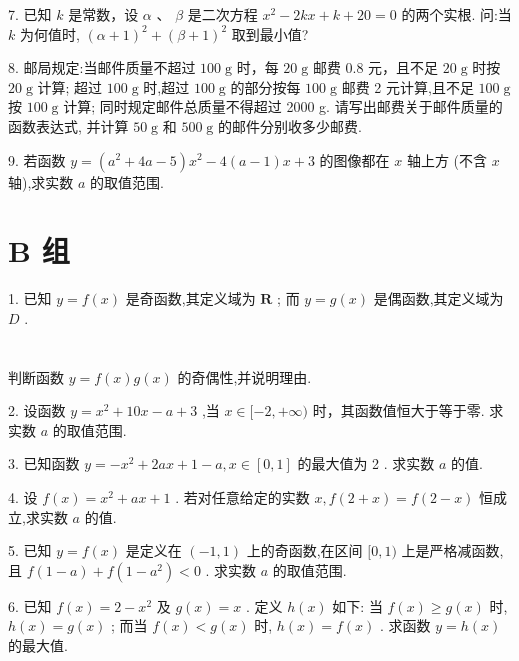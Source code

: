 \documentclass[10pt]{article}
\begin{document}
7. 已知 \(k\) 是常数，设 \(\alpha\) 、 \(\beta\) 是二次方程 \({x}^{2} - {2kx} + k + {20} = 0\) 的两个实根. 问:当 \(k\) 为何值时, \({\left( \alpha  + 1\right) }^{2} + {\left( \beta  + 1\right) }^{2}\) 取到最小值?

8. 邮局规定:当邮件质量不超过 \({100}\mathrm{\;g}\) 时，每 \({20}\mathrm{\;g}\) 邮费 0.8 元，且不足 \({20}\mathrm{\;g}\) 时按 \({20}\mathrm{\;g}\) 计算; 超过 \({100}\mathrm{\;g}\) 时,超过 \({100}\mathrm{\;g}\) 的部分按每 \({100}\mathrm{\;g}\) 邮费 2 元计算,且不足 \({100}\mathrm{\;g}\) 按 \({100}\mathrm{\;g}\) 计算; 同时规定邮件总质量不得超过 2000 g. 请写出邮费关于邮件质量的函数表达式, 并计算 \({50}\mathrm{\;g}\) 和 \({500}\mathrm{\;g}\) 的邮件分别收多少邮费.

9. 若函数 \(y = \left( {{a}^{2} + {4a} - 5}\right) {x}^{2} - 4\left( {a - 1}\right) x + 3\) 的图像都在 \(x\) 轴上方 (不含 \(x\) 轴),求实数 \(a\) 的取值范围.

\section*{B 组}

1. 已知 \(y = f\left( x\right)\) 是奇函数,其定义域为 \(\mathbf{R}\) ; 而 \(y = g\left( x\right)\) 是偶函数,其定义域为 \(D\) .

\section*{}

判断函数 \(y = f\left( x\right) g\left( x\right)\) 的奇偶性,并说明理由.

2. 设函数 \(y = {x}^{2} + {10x} - a + 3\) ,当 \(x \in  \lbrack  - 2, + \infty )\) 时，其函数值恒大于等于零. 求实数 \(a\) 的取值范围.

3. 已知函数 \(y =  - {x}^{2} + {2ax} + 1 - a,x \in  \left\lbrack  {0,1}\right\rbrack\) 的最大值为 2 . 求实数 \(a\) 的值.

4. 设 \(f\left( x\right)  = {x}^{2} + {ax} + 1\) . 若对任意给定的实数 \(x,f\left( {2 + x}\right)  = f\left( {2 - x}\right)\) 恒成立,求实数 \(a\) 的值.

5. 已知 \(y = f\left( x\right)\) 是定义在 \(\left( {-1,1}\right)\) 上的奇函数,在区间 \(\lbrack 0,1)\) 上是严格减函数,且 \(f\left( {1 - a}\right)  + f\left( {1 - {a}^{2}}\right)  < 0\) . 求实数 \(a\) 的取值范围.

6. 已知 \(f\left( x\right)  = 2 - {x}^{2}\) 及 \(g\left( x\right)  = x\) . 定义 \(h\left( x\right)\) 如下: 当 \(f\left( x\right)  \geq  g\left( x\right)\) 时, \(h\left( x\right)  = g\left( x\right)\) ; 而当 \(f\left( x\right)  < g\left( x\right)\) 时, \(h\left( x\right)  = f\left( x\right)\) . 求函数 \(y = h\left( x\right)\) 的最大值.
\end{document}
